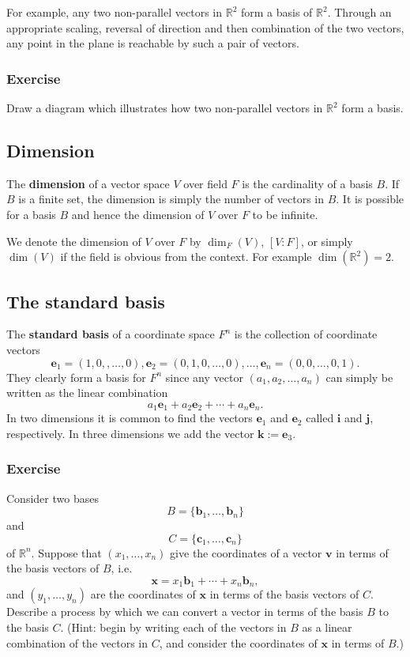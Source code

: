 \documentclass[a4paper,12pt]{amsart}
\begin{document}
    For example, any two non-parallel vectors in $\mathbb{R}^2$ form a basis of $\mathbb{R}^2$. Through an appropriate scaling, reversal of direction and then combination of the two vectors, any point in the plane is reachable by such a pair of vectors.

    \subsubsection{Exercise} Draw a diagram which illustrates how two non-parallel vectors in $\mathbb{R}^2$ form a basis.

    \subsection{Dimension} The \textbf{dimension} of a vector space $V$ over field $F$ is the cardinality of a basis $B$. If $B$ is a finite set, the dimension is simply the number of vectors in $B$. It is possible for a basis $B$ and hence the dimension of $V$ over $F$ to be infinite.

    We denote the dimension of $V$ over $F$ by $\dim_F(V)$, $[V : F]$, or simply $\dim(V)$ if the field is obvious from the context. For example $\dim(\mathbb{R}^2) = 2$.

    \subsection{The standard basis}

    The \textbf{standard basis} of a coordinate space $F^n$ is the collection of coordinate vectors 
    \[ \mathbf{e}_1 = (1, 0, , \ldots, 0), \mathbf{e}_2 = (0, 1, 0, \ldots, 0), \ldots, \mathbf{e}_n = (0, 0, \ldots, 0, 1). \]
    They clearly form a basis for $F^n$ since any vector $(a_1, a_2, \ldots, a_n)$ can simply be written as the linear combination
    \[ a_1 \mathbf{e}_1 + a_2 \mathbf{e}_2 + \cdots + a_n \mathbf{e}_n. \]
    In two dimensions it is common to find the vectors $\mathbf{e}_1$ and $\mathbf{e}_2$ called $\mathbf{i}$ and $\mathbf{j}$, respectively. In three dimensions we add the vector $\mathbf{k} := \mathbf{e}_3$.

    \subsubsection{Exercise} Consider two bases 
    \[ B = \{ \mathbf{b}_1, \ldots, \mathbf{b}_n \} \] 
    and 
    \[ C = \{ \mathbf{c}_1, \ldots, \mathbf{c}_n \} \] 
    of $\mathbb{R}^n$. Suppose that $(x_1, \ldots, x_n)$ give the coordinates of a vector $\mathbf{v}$ in terms of the basis vectors of $B$, i.e.
    \[ \mathbf{x} = x_1 \mathbf{b}_1 + \cdots + x_n \mathbf{b}_n, \]
    and $(y_1, \ldots, y_n)$ are the coordinates of $\mathbf{x}$ in terms of the basis vectors of $C$. Describe a process by which we can convert a vector in terms of the basis $B$ to the basis $C$. (Hint: begin by writing each of the vectors in $B$ as a linear combination of the vectors in $C$, and consider the coordinates of $\mathbf{x}$ in terms of $B$.)
\end{document}
